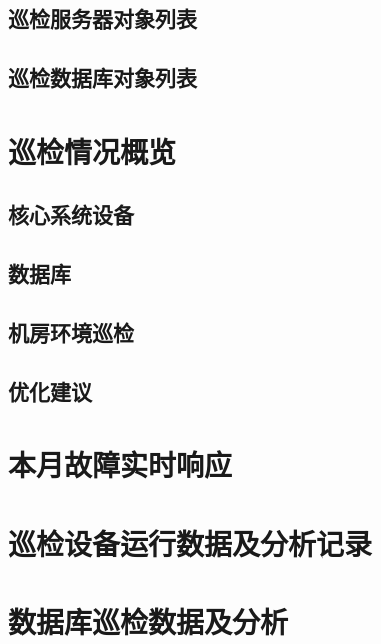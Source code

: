 \documentclass[cs4size,a4paper,fancyhdr,fntef,hyperref]{ctexrep}
\begin{document}
    \section{巡检服务器对象列表}
    \section{巡检数据库对象列表}
\chapter{巡检情况概览}\thispagestyle{fancy}
    \section{核心系统设备}
    \section{数据库}
    \section{机房环境巡检}
    \section{优化建议}
\chapter{本月故障实时响应}\thispagestyle{fancy}
\chapter{巡检设备运行数据及分析记录}\thispagestyle{fancy}
\chapter{数据库巡检数据及分析}\thispagestyle{fancy}
\end{document}

